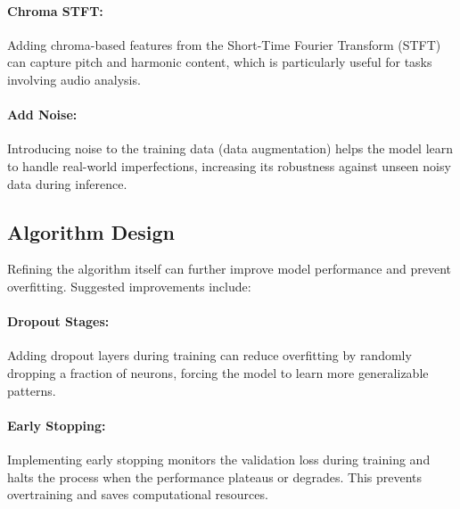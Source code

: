 \paragraph{Chroma STFT:} Adding chroma-based features from the Short-Time Fourier Transform (STFT) can capture pitch and harmonic content, which is particularly useful for tasks involving audio analysis.

\paragraph{Add Noise:} Introducing noise to the training data (data augmentation) helps the model learn to handle real-world imperfections, increasing its robustness against unseen noisy data during inference.


\subsection{Algorithm Design}
Refining the algorithm itself can further improve model performance and prevent overfitting. Suggested improvements include:

\paragraph{Dropout Stages:} Adding dropout layers during training can reduce overfitting by randomly dropping a fraction of neurons, forcing the model to learn more generalizable patterns.

\paragraph{Early Stopping:} Implementing early stopping monitors the validation loss during training and halts the process when the performance plateaus or degrades. This prevents overtraining and saves computational resources.